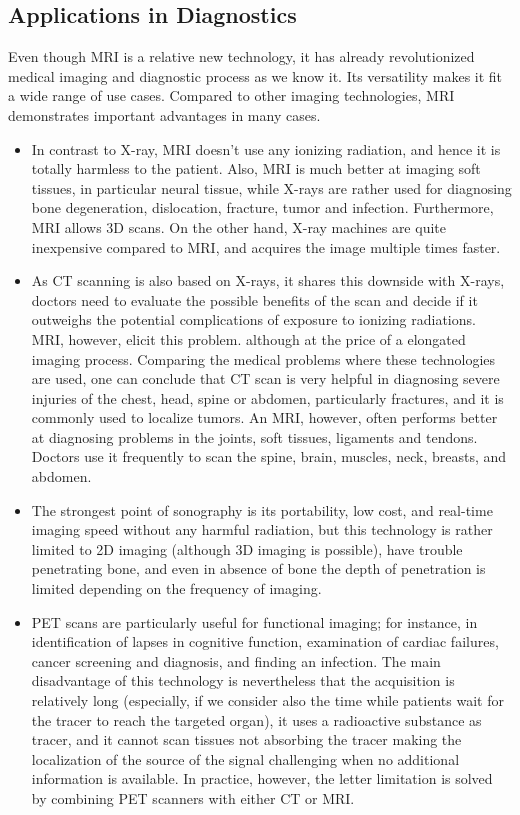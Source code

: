 \subsection{Applications in Diagnostics}
Even though MRI is a relative new technology, it has already revolutionized medical imaging and diagnostic process as we know it. Its versatility makes it fit a wide range of use cases. Compared to other imaging technologies, MRI demonstrates important advantages in many cases. 
\begin{itemize}
    \item In contrast to X-ray, MRI doesn't use any ionizing radiation, and hence it is totally harmless to the patient. Also, MRI is much better at imaging soft tissues, in particular neural tissue,  while X-rays are rather used for diagnosing bone degeneration, dislocation, fracture, tumor and infection. Furthermore, MRI allows 3D scans. On the other hand, X-ray machines are quite inexpensive compared to MRI, and acquires the image multiple times faster.
    \item As CT scanning is also based on X-rays, it shares this downside with X-rays, doctors need to evaluate the possible benefits of the scan and decide if it outweighs the potential complications of exposure to ionizing radiations. MRI, however, elicit this problem. although at the price of a elongated imaging process. Comparing the medical problems where these technologies are used, one can conclude that CT scan is very helpful in diagnosing severe injuries of the chest, head, spine or abdomen, particularly fractures, and it is commonly used to localize tumors. An MRI, however, often performs better at diagnosing problems in the joints, soft tissues, ligaments and tendons. Doctors use it frequently to scan the spine, brain, muscles, neck, breasts, and abdomen.
    \item The strongest point of sonography is its portability, low cost, and real-time imaging speed without any harmful radiation, but this technology is rather limited to 2D imaging (although 3D imaging is possible), have trouble penetrating bone, and even in absence of bone the depth of penetration is limited depending on the frequency of imaging.
    \item PET scans are particularly useful for functional imaging; for instance, in identification of lapses in cognitive function, examination of cardiac failures, cancer screening and diagnosis, and finding an infection. The main disadvantage of this technology is nevertheless that the acquisition is relatively long (especially, if we consider also the time while patients wait for the tracer to reach the targeted organ), it uses a radioactive substance as tracer, and it cannot scan tissues not absorbing the tracer making the localization of the source of the signal challenging when no additional information is available. In practice, however, the letter limitation is solved by combining PET scanners with either CT or MRI.
\end{itemize}
